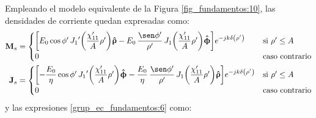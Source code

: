 Empleando el modelo equivalente de la Figura \ref{fig_fundamentos:10}, las densidades de corriente quedan expresadas como:
\begin{align}
\mathbf{M}_s &=
\begin{cases}
\makebox[0pt][l]{$\left[E_0\cos\phi '\,{J_1}'\!\left(\dfrac{\chi '_{11}}{A}\rho '\right)\!\versor{\uprho} - E_0\,\dfrac{\sen\phi '}{\rho '}\,J_1\!\left(\dfrac{\chi '_{11}}{A}\rho '\right)\!\versor{\upphi}\right]\!e^{-jk\delta\left(\rho '\right)}$}\hphantom{\left[- \dfrac{E_0}{\eta}\cos\phi '\,{J_1}'\!\left(\dfrac{\chi '_{11}}{A}\rho '\right)\!\versor{\upphi} - \dfrac{E_0}{\eta}\,\dfrac{\sen\phi '}{\rho '}\,J_1\!\left(\dfrac{\chi '_{11}}{A}\rho '\right)\!\versor{\uprho}\right]\!e^{-jk\delta\left(\rho '\right)}} &\text{si } \rho '\leq A\\
0 &\text{caso contrario}
\end{cases}
\label{ec_apC:115}\\
\mathbf{J}_s &= 
\begin{cases} 
\left[- \dfrac{E_0}{\eta}\cos\phi '\,{J_1}'\!\left(\dfrac{\chi '_{11}}{A}\rho '\right)\!\versor{\upphi} - \dfrac{E_0}{\eta}\,\dfrac{\sen\phi '}{\rho '}\,J_1\!\left(\dfrac{\chi '_{11}}{A}\rho '\right)\!\versor{\uprho}\right]\!e^{-jk\delta\left(\rho '\right)} &\text{si } \rho '\leq A\\
0  &\text{caso contrario}
\end{cases}
\label{ec_apC:116}
\end{align}
y las expresiones \eqref{grup_ec_fundamentos:6} como:
